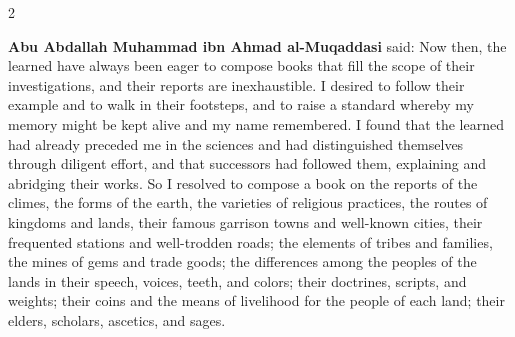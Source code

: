 \documentclass[11pt,a4paper]{article}
\begin{document}
\begin{paracol}{2}

\switchcolumn[0]
\begin{flushright}
{\small\arabicfont
{}}
\end{flushright}

\switchcolumn[1]
\begin{flushleft}
\small
\textbf{Abu Abdallah Muhammad ibn Ahmad al-Muqaddasi} said: Now then, the learned have always been eager to compose books that fill the scope of their investigations, and their reports are inexhaustible. I desired to follow their example and to walk in their footsteps, and to raise a standard whereby my memory might be kept alive and my name remembered. I found that the learned had already preceded me in the sciences and had distinguished themselves through diligent effort, and that successors had followed them, explaining and abridging their works. So I resolved to compose a book on the reports of the climes, the forms of the earth, the varieties of religious practices, the routes of kingdoms and lands, their famous garrison towns and well-known cities, their frequented stations and well-trodden roads; the elements of tribes and families, the mines of gems and trade goods; the differences among the peoples of the lands in their speech, voices, teeth, and colors; their doctrines, scripts, and weights; their coins and the means of livelihood for the people of each land; their elders, scholars, ascetics, and sages.
\end{flushleft}

\end{paracol}
\end{document}
